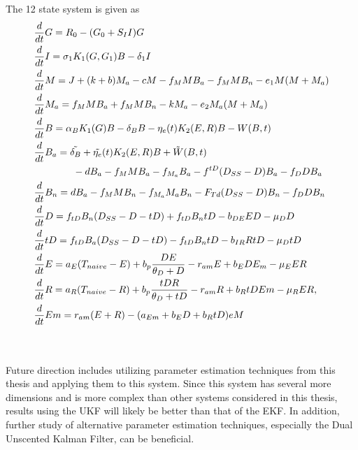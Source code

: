 The 12 state system is given as 
\begin{align*}
    &\frac{d}{dt} G = R_0 - (G_0 + S_I I)G \\ 
    &\frac{d}{dt}  I = \sigma_1 K_1 (G, G_1) B - \delta_1 I \\
    &\frac{d}{dt} M = J +(k+b)M_a -cM - f_M MB_a - f_M MB_n - e_1M(M+M_a) \\
    & \frac{d}{dt} M_a = f_M MB_a +f_M MB_n - kM_a - e_2M_a(M + M_a) \\
    &\frac{d}{dt} B = \alpha_B K_1(G)B - \delta_B B - \eta_e(t)K_2(E,R)B - W(B, t)\\
    & \frac{d}{dt} B_a = \Tilde{\delta_B} + \Tilde{\eta_e} (t)K_2(E,R)B + \Tilde{W}(B, t) \\
    & \quad \quad  \quad \quad - dB_a - f_M MB_a - f_{M_a} B_a - f^{tD}(D_{SS} - D)B_a - f_D DB_a \\
    &\frac{d}{dt} B_n = dB_a - f_M MB_n - f_{M_a} M_a B_n - F_{Td}(D_{SS} - D)B_n - f_D DB_n \\
    & \frac{d}{dt} D = f_{tD}B_n(D_{SS} - D - tD) + f_{tD}B_n tD - b_{DE} ED - \mu_D D \\
    & \frac{d}{dt} tD = f_{tD}B_a(D_{SS} - D - tD) - f_{tD}B_n tD - b_{IR}RtD - \mu_D tD \\
    & \frac{d}{dt} E = a_E (T_{naive} - E) + b_p \frac{DE}{\theta_D + D} - r_{am}E + b_EDE_m - \mu_E ER \\
    & \frac{d}{dt} R = a_R (T_{naive} - R) + b_p \frac{tDR}{\theta_D + tD} - r_{am}R + b_R tDEm - \mu_R ER, \\
    & \frac{d}{dt} Em = r_{am}(E + R) - (a_{Em} + b_E D + b_R tD)eM
\end{align*}

\noindent \\ \\
\noindent Future direction includes utilizing parameter estimation techniques from this thesis and applying them to this system. Since this system has several more dimensions and is more complex than other systems considered in this thesis, results using the UKF will likely be better than that of the EKF. In addition, further study of alternative parameter estimation techniques, especially the Dual Unscented Kalman Filter, can be beneficial. \\ \\

